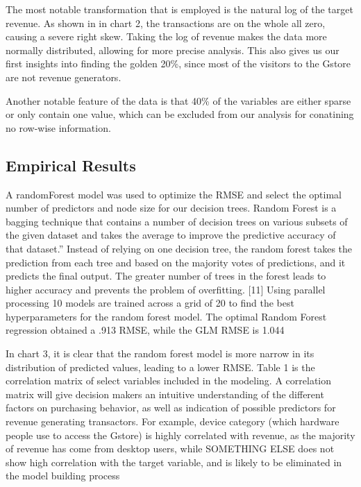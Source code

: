 \documentclass[]{tufte-handout}
\begin{document}
The most notable transformation that is employed is the natural log of
the target revenue. As shown in in chart 2, the transactions are on the
whole all zero, causing a severe right skew. Taking the log of revenue
makes the data more normally distributed, allowing for more precise
analysis. This also gives us our first insights into finding the golden
20\%, since most of the visitors to the Gstore are not revenue
generators.

Another notable feature of the data is that 40\% of the variables are
either sparse or only contain one value, which can be excluded from our
analysis for conatining no row-wise information.

\hypertarget{empirical-results}{%
\subsection{Empirical Results}\label{empirical-results}}

A randomForest model was used to optimize the RMSE and select the
optimal number of predictors and node size for our decision trees.
Random Forest is a bagging technique that contains a number of decision
trees on various subsets of the given dataset and takes the average to
improve the predictive accuracy of that dataset.'' Instead of relying on
one decision tree, the random forest takes the prediction from each tree
and based on the majority votes of predictions, and it predicts the
final output. The greater number of trees in the forest leads to higher
accuracy and prevents the problem of overfitting. {[}11{]} Using
parallel processing 10 models are trained across a grid of 20 to find
the best hyperparameters for the random forest model. The optimal Random
Forest regression obtained a .913 RMSE, while the GLM RMSE is 1.044

In chart 3, it is clear that the random forest model is more narrow in
its distribution of predicted values, leading to a lower RMSE. Table 1
is the correlation matrix of select variables included in the modeling.
A correlation matrix will give decision makers an intuitive
understanding of the different factors on purchasing behavior, as well
as indication of possible predictors for revenue generating transactors.
For example, device category (which hardware people use to access the
Gstore) is highly correlated with revenue, as the majority of revenue
has come from desktop users, while SOMETHING ELSE does not show high
correlation with the target variable, and is likely to be eliminated in
the model building process
\end{document}

